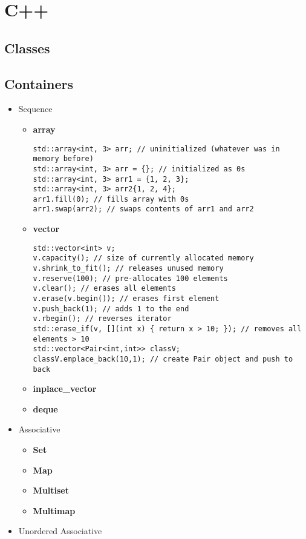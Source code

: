 \documentclass{article}
\begin{document}
\section{C++}
\subsection{Classes}
\subsection{Containers}
\begin{itemize}
	\item Sequence
	      \begin{itemize}
		      \item \textbf{array}
		            \begin{lstlisting}[style=cpp]
std::array<int, 3> arr; // uninitialized (whatever was in memory before)
std::array<int, 3> arr = {}; // initialized as 0s
std::array<int, 3> arr1 = {1, 2, 3};
std::array<int, 3> arr2{1, 2, 4};
arr1.fill(0); // fills array with 0s
arr1.swap(arr2); // swaps contents of arr1 and arr2
				  \end{lstlisting}
		      \item \textbf{vector}
		            \begin{lstlisting}[style=cpp]
std::vector<int> v;
v.capacity(); // size of currently allocated memory
v.shrink_to_fit(); // releases unused memory
v.reserve(100); // pre-allocates 100 elements
v.clear(); // erases all elements
v.erase(v.begin()); // erases first element
v.push_back(1); // adds 1 to the end
v.rbegin(); // reverses iterator
std::erase_if(v, [](int x) { return x > 10; }); // removes all elements > 10
std::vector<Pair<int,int>> classV;
classV.emplace_back(10,1); // create Pair object and push to back
			      \end{lstlisting}
		      \item \textbf{inplace\_vector}
		      \item \textbf{deque}
	      \end{itemize}
	\item Associative
	      \begin{itemize}
		      \item \textbf{Set}
		      \item \textbf{Map}
		      \item \textbf{Multiset}
		      \item \textbf{Multimap}
	      \end{itemize}
	\item Unordered Associative

\end{itemize}
\end{document}

